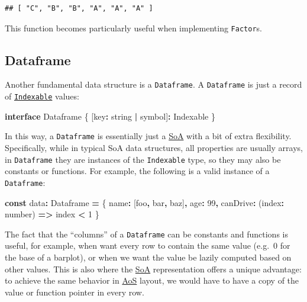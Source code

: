 \documentclass[
]{book}
\newenvironment{Shaded}{\begin{snugshade}}{\end{snugshade}}
\newcommand{\DataTypeTok}[1]{\textcolor[rgb]{0.13,0.29,0.53}{#1}}
\newcommand{\DecValTok}[1]{\textcolor[rgb]{0.00,0.00,0.81}{#1}}
\newcommand{\KeywordTok}[1]{\textcolor[rgb]{0.13,0.29,0.53}{\textbf{#1}}}
\newcommand{\NormalTok}[1]{#1}
\newcommand{\OperatorTok}[1]{\textcolor[rgb]{0.81,0.36,0.00}{\textbf{#1}}}
\newcommand{\VerbatimStringTok}[1]{\textcolor[rgb]{0.31,0.60,0.02}{#1}}
\theoremstyle{definition}
\theoremstyle{definition}
\theoremstyle{definition}
\theoremstyle{definition}
\theoremstyle{remark}
\begin{document}
\begin{verbatim}
## [ "C", "B", "B", "A", "A", "A" ]
\end{verbatim}

This function becomes particularly useful when implementing \texttt{Factor}s.

\subsection{Dataframe}\label{dataframe}

Another fundamental data structure is a \texttt{Dataframe}. A \texttt{Dataframe} is just a record of \hyperref[Indexable]{\texttt{Indexable}} values:

\begin{Shaded}
\begin{Highlighting}[]
\KeywordTok{interface}\NormalTok{ Dataframe \{}
\NormalTok{  [key}\OperatorTok{:} \DataTypeTok{string} \OperatorTok{|} \DataTypeTok{symbol}\NormalTok{]}\OperatorTok{:}\NormalTok{ Indexable}
\NormalTok{\}}
\end{Highlighting}
\end{Shaded}

In this way, a \texttt{Dataframe} is essentially just a \hyperref[SoA]{SoA} with a bit of extra flexibility. Specifically, while in typical SoA data structures, all properties are usually arrays, in \texttt{Dataframe} they are instances of the \texttt{Indexable} type, so they may also be constants or functions. For example, the following is a valid instance of a \texttt{Dataframe}:

\begin{Shaded}
\begin{Highlighting}[]
\KeywordTok{const}\NormalTok{ data}\OperatorTok{:}\NormalTok{ Dataframe }\OperatorTok{=}\NormalTok{ \{}
\NormalTok{  name}\OperatorTok{:}\NormalTok{ [}\VerbatimStringTok{\textasciigrave{}foo\textasciigrave{}}\OperatorTok{,} \VerbatimStringTok{\textasciigrave{}bar\textasciigrave{}}\OperatorTok{,} \VerbatimStringTok{\textasciigrave{}baz\textasciigrave{}}\NormalTok{]}\OperatorTok{,}
\NormalTok{  age}\OperatorTok{:} \DecValTok{99}\OperatorTok{,}
\NormalTok{  canDrive}\OperatorTok{:}\NormalTok{ (index}\OperatorTok{:} \DataTypeTok{number}\NormalTok{) }\KeywordTok{=\textgreater{}}\NormalTok{ index }\OperatorTok{\textless{}} \DecValTok{1}
\NormalTok{\}}
\end{Highlighting}
\end{Shaded}

The fact that the ``columns'' of a \texttt{Dataframe} can be constants and functions is useful, for example, when want every row to contain the same value (e.g.~0 for the base of a barplot), or when we want the value be lazily computed based on other values. This is also where the \hyperref[SoA]{SoA} representation offers a unique advantage: to achieve the same behavior in \hyperref[SoA]{AoS} layout, we would have to have a copy of the value or function pointer in every row.
\end{document}
